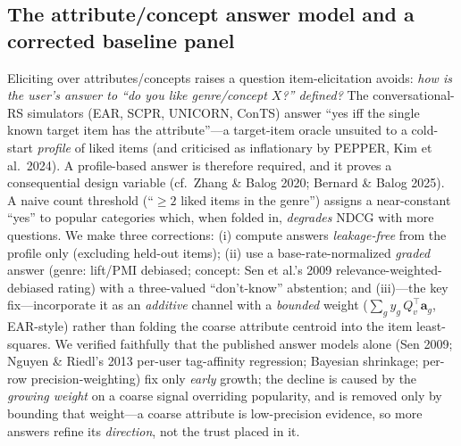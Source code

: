 \documentclass[11pt]{article}
\begin{document}
\subsection{The attribute/concept answer model and a corrected baseline panel}\label{sec:answermodel}
Eliciting over attributes/concepts raises a question item-elicitation avoids: \emph{how is the user's answer to
``do you like genre/concept $X$?'' defined?} The conversational-RS simulators (EAR, SCPR, UNICORN, ConTS) answer
``yes iff the single known target item has the attribute''---a target-item oracle unsuited to a cold-start
\emph{profile} of liked items (and criticised as inflationary by PEPPER, Kim et al.\ 2024). A profile-based answer
is therefore required, and it proves a consequential design variable (cf.\ Zhang \& Balog 2020; Bernard \& Balog
2025). A naive count threshold (``$\ge 2$ liked items in the genre'') assigns a near-constant ``yes'' to popular
categories which, when folded in, \emph{degrades} NDCG with more questions. We make three corrections: (i) compute
answers \emph{leakage-free} from the profile only (excluding held-out items); (ii) use a base-rate-normalized
\emph{graded} answer (genre: lift/PMI debiased; concept: Sen et al.'s 2009 relevance-weighted-debiased rating) with
a three-valued ``don't-know'' abstention; and (iii)---the key fix---incorporate it as an \emph{additive} channel
with a \emph{bounded} weight ($\sum_g y_g\,Q_v^\top\mathbf a_g$, EAR-style) rather than folding the coarse attribute
centroid into the item least-squares. We verified faithfully that the published answer models alone (Sen 2009;
Nguyen \& Riedl's 2013 per-user tag-affinity regression; Bayesian shrinkage; per-row precision-weighting) fix only
\emph{early} growth; the decline is caused by the \emph{growing weight} on a coarse signal overriding popularity,
and is removed only by bounding that weight---a coarse attribute is low-precision evidence, so more answers refine
its \emph{direction}, not the trust placed in it.
\end{document}
